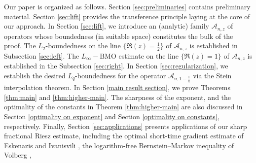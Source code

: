 \documentclass{amsart}
\numberwithin{equation}{section}
\theoremstyle{definition}
\theoremstyle{remark}
\newcommand{\1}{\mathbf 1}
\newcommand{\BMO}{\mathrm{BMO}}
\begin{document}
%


Our paper is organized as follows. Section \ref{sec:preliminaries} contains preliminary material. Section \ref{sec:lift} provides the transference principle laying at the core of our approach. In Section \ref{sec:lift}, we introduce an (analytic) family $\mathcal{A}_{n,z}$ of operators whose boundedness (in suitable space) constitutes the bulk of the proof. The $L_2$-boundedness on the line $\{\Re(z)=\frac12\}$ of $\mathcal{A}_{n,z}$  is established in Subsection \ref{sec:left}.  The $L_{\infty}-\BMO$ estimate on the line $\{\Re(z)=1\}$  of $\mathcal{A}_{n,z}$  is established in the Subsection \ref{sec:right}.   In Section \ref{sec:regularization}, we establish the desired $L_{q}$-boundedness for the operator $\mathcal{A}_{n,1-\frac1q}$ via the Stein interpolation theorem. In Section \ref{main result section}, we prove Theorems \ref{thm:main} and \ref{thm:higher-main}.  The  sharpness of the exponent, and the optimality of the constants in Theorem \ref{thm:higher-main} are also discussed in Section \ref{optimality on exponent} and  Section \ref{optimality on constants}, respectively. Finally, Section \ref{sec:applications} presents applications of our sharp fractional Riesz estimate, including the optimal short-time gradient estimate of Eskenazis and Ivanisvili \cite{E-I2020}, the  logarithm-free Bernstein--Markov inequality of Volberg \cite{V2024}, 
\end{document}
